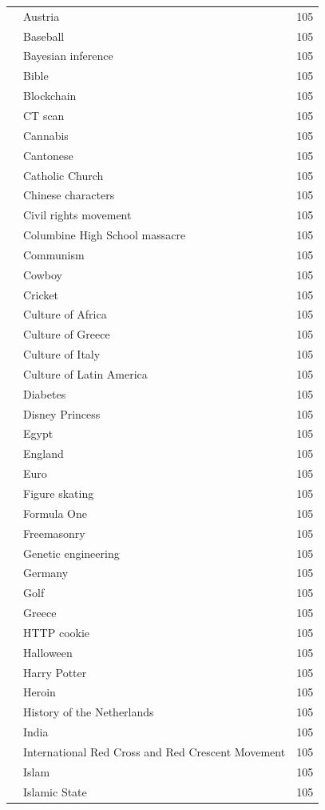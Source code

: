 \documentclass{article}
\begin{document}
{\begin{longtable}{p{}p{}r}
 & Austria & 105 \\
 & Baseball & 105 \\
 & Bayesian inference & 105 \\
 & Bible & 105 \\
 & Blockchain & 105 \\
 & CT scan & 105 \\
 & Cannabis & 105 \\
 & Cantonese & 105 \\
 & Catholic Church & 105 \\
 & Chinese characters & 105 \\
 & Civil rights movement & 105 \\
 & Columbine High School massacre & 105 \\
 & Communism & 105 \\
 & Cowboy & 105 \\
 & Cricket & 105 \\
 & Culture of Africa & 105 \\
 & Culture of Greece & 105 \\
 & Culture of Italy & 105 \\
 & Culture of Latin America & 105 \\
 & Diabetes & 105 \\
 & Disney Princess & 105 \\
 & Egypt & 105 \\
 & England & 105 \\
 & Euro & 105 \\
 & Figure skating & 105 \\
 & Formula One & 105 \\
 & Freemasonry & 105 \\
 & Genetic engineering & 105 \\
 & Germany & 105 \\
 & Golf & 105 \\
 & Greece & 105 \\
 & HTTP cookie & 105 \\
 & Halloween & 105 \\
 & Harry Potter & 105 \\
 & Heroin & 105 \\
 & History of the Netherlands & 105 \\
 & India & 105 \\
 & International Red Cross and Red Crescent Movement & 105 \\
 & Islam & 105 \\
 & Islamic State & 105 \\

\end{longtable}}
\end{document}

